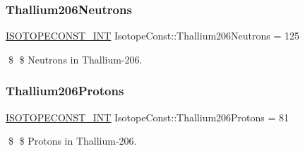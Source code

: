 \subsubsection{\texorpdfstring{Thallium206\+Neutrons}{Thallium206Neutrons}}
{\footnotesize\ttfamily \mbox{\hyperlink{group___isotope_const-_macros_ga5f18360b3e99483a35c32d789e62621c}{I\+S\+O\+T\+O\+P\+E\+C\+O\+N\+S\+T\+\_\+\+I\+NT}} Isotope\+Const\+::\+Thallium206\+Neutrons = 125}

\$ \$ Neutrons in Thallium-\/206. \mbox{\label{group___isotope_const-_thallium-_tl206_ga5635562e6ae514824515f1a0e88ad8e4}} 
\subsubsection{\texorpdfstring{Thallium206\+Protons}{Thallium206Protons}}
{\footnotesize\ttfamily \mbox{\hyperlink{group___isotope_const-_macros_ga5f18360b3e99483a35c32d789e62621c}{I\+S\+O\+T\+O\+P\+E\+C\+O\+N\+S\+T\+\_\+\+I\+NT}} Isotope\+Const\+::\+Thallium206\+Protons = 81}

\$ \$ Protons in Thallium-\/206. 